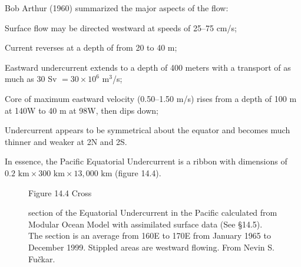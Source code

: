 Bob Arthur (1960) summarized the major aspects of the flow:
\begin{enumerate}
\vitem Surface flow may be directed westward at speeds of 25--75 cm/s;

\vitem Current reverses at a depth of from 20 to 40 m;

\vitem Eastward undercurrent extends to a depth of 400 meters with a
transport of as much as 30
Sv $=30 \times 10^6$ m$^3$/s;

\vitem Core of maximum eastward velocity (0.50--1.50 m/s) rises from a
depth of 100 m at 140\degrees W to 40 m at 98\degrees W, then dips
down;

\vitem Undercurrent appears to be symmetrical about the equator and
becomes much thinner and weaker at 2\degrees N and 2\degrees S.
\end{enumerate}
In essence, the Pacific Equatorial Undercurrent is a ribbon with
dimensions of $0.2 \text{ km} \times 300 \text{ km} \times 13,000
\text{ km}$ (figure 14.4).

\begin{figure}[t!]
\footnotesize
Figure 14.4 Cross \rule{0pt}{4ex}section of the Equatorial
Undercurrent in the Pacific calculated from Modular Ocean Model with
assimilated surface data (See \S 14.5). The section is an average from
160\degrees E to 170\degrees E from January 1965 to December
1999. Stippled areas are westward flowing. From Nevin S. Fu\v{c}kar.

\label{fig:equatorialxsec}
\vspace{-3ex}
\end{figure}

